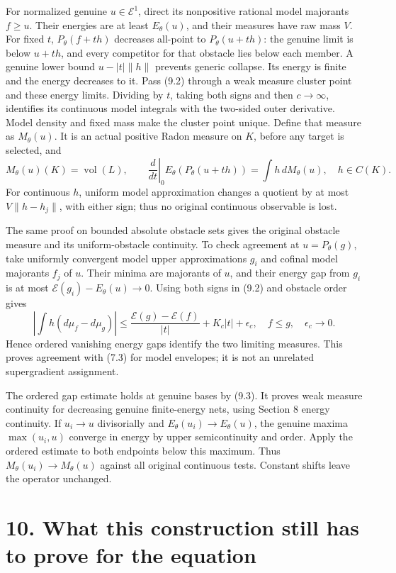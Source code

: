 \documentclass[
  10pt,
]{article}
\begin{document}
For normalized genuine \(u\in\mathcal E^1\), direct its nonpositive
rational model majorants \(f\geq u\). Their energies are at least
\(E_\theta(u)\), and their measures have raw mass \(V\). For fixed
\(t\), \(P_\theta(f+th)\) decreases all-point to \(P_\theta(u+th)\): the
genuine limit is below \(u+th\), and every competitor for that obstacle
lies below each member. A genuine lower bound \(u-|t|\|h\|\) prevents
generic collapse. Its energy is finite and the energy decreases to it.
Pass (9.2) through a weak measure cluster point and these energy limits.
Dividing by \(t\), taking both signs and then \(c\to\infty\), identifies
its continuous model integrals with the two-sided outer derivative.
Model density and fixed mass make the cluster point unique. Define that
measure as \(M_\theta(u)\). It is an actual positive Radon measure on
\(K\), before any target is selected, and
\[M_\theta(u)(K)=\operatorname{vol}(L),\qquad
\left.\frac{d}{dt}\right|_0E_\theta(P_\theta(u+th))
=\int h\,dM_\theta(u),\quad h\in C(K).\tag{9.3}\] For continuous \(h\),
uniform model approximation changes a quotient by at most
\(V\|h-h_j\|\), with either sign; thus no original continuous observable
is lost.

The same proof on bounded absolute obstacle sets gives the original
obstacle measure and its uniform-obstacle continuity. To check agreement
at \(u=P_\theta(g)\), take uniformly convergent model upper
approximations \(g_i\) and cofinal model majorants \(f_j\) of \(u\).
Their minima are majorants of \(u\), and their energy gap from \(g_i\)
is at most \(\mathscr E(g_i)-E_\theta(u)\to0\). Using both signs in
(9.2) and obstacle order gives \[\left|\int h(d\mu_f-d\mu_g)\right|
\leq\frac{\mathscr E(g)-\mathscr E(f)}{|t|}
+K_c|t|+\epsilon_c,\quad f\leq g,\quad\epsilon_c\to0.\] Hence ordered
vanishing energy gaps identify the two limiting measures. This proves
agreement with (7.3) for model envelopes; it is not an unrelated
supergradient assignment.

The ordered gap estimate holds at genuine bases by (9.3). It proves weak
measure continuity for decreasing genuine finite-energy nets, using
Section 8 energy continuity. If \(u_i\to u\) divisorially and
\(E_\theta(u_i)\to E_\theta(u)\), the genuine maxima \(\max(u_i,u)\)
converge in energy by upper semicontinuity and order. Apply the ordered
estimate to both endpoints below this maximum. Thus
\(M_\theta(u_i)\to M_\theta(u)\) against all original continuous tests.
Constant shifts leave the operator unchanged.

\section{10. What this construction still has to prove for the
equation}\label{what-this-construction-still-has-to-prove-for-the-equation}
\end{document}
